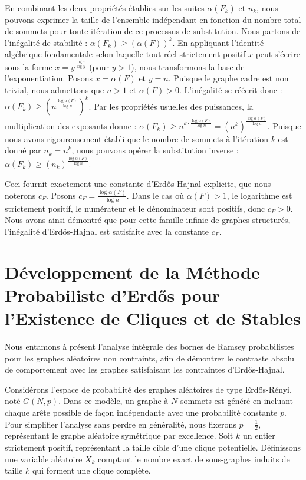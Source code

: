 \documentclass[11pt, a4paper]{article}
\begin{document}
En combinant les deux propriétés établies sur les suites $\alpha(F_k)$ et $n_k$, nous pouvons exprimer la taille de l'ensemble indépendant en fonction du nombre total de sommets pour toute itération de ce processus de substitution.
Nous partons de l'inégalité de stabilité :
$\alpha(F_k) \ge (\alpha(F))^k$.
En appliquant l'identité algébrique fondamentale selon laquelle tout réel strictement positif $x$ peut s'écrire sous la forme $x = y^{\frac{\log x}{\log y}}$ (pour $y>1$), nous transformons la base de l'exponentiation.
Posons $x = \alpha(F)$ et $y = n$. Puisque le graphe cadre est non trivial, nous admettons que $n > 1$ et $\alpha(F) > 0$.
L'inégalité se réécrit donc :
$\alpha(F_k) \ge \left( n^{\frac{\log \alpha(F)}{\log n}} \right)^k$.
Par les propriétés usuelles des puissances, la multiplication des exposants donne :
$\alpha(F_k) \ge n^{k \cdot \frac{\log \alpha(F)}{\log n}} = (n^k)^{\frac{\log \alpha(F)}{\log n}}$.
Puisque nous avons rigoureusement établi que le nombre de sommets à l'itération $k$ est donné par $n_k = n^k$, nous pouvons opérer la substitution inverse :
$\alpha(F_k) \ge (n_k)^{\frac{\log \alpha(F)}{\log n}}$.

Ceci fournit exactement une constante d'Erdős-Hajnal explicite, que nous noterons $c_F$.
Posons $c_F = \frac{\log \alpha(F)}{\log n}$.
Dans le cas où $\alpha(F) > 1$, le logarithme est strictement positif, le numérateur et le dénominateur sont positifs, donc $c_F > 0$.
Nous avons ainsi démontré que pour cette famille infinie de graphes structurés, l'inégalité d'Erdős-Hajnal est satisfaite avec la constante $c_F$.

\newpage
\section{Développement de la Méthode Probabiliste d'Erdős pour l'Existence de Cliques et de Stables}

Nous entamons à présent l'analyse intégrale des bornes de Ramsey probabilistes pour les graphes aléatoires non contraints, afin de démontrer le contraste absolu de comportement avec les graphes satisfaisant les contraintes d'Erdős-Hajnal.

Considérons l'espace de probabilité des graphes aléatoires de type Erdős-Rényi, noté $G(N, p)$.
Dans ce modèle, un graphe à $N$ sommets est généré en incluant chaque arête possible de façon indépendante avec une probabilité constante $p$.
Pour simplifier l'analyse sans perdre en généralité, nous fixerons $p = \frac{1}{2}$, représentant le graphe aléatoire symétrique par excellence.
Soit $k$ un entier strictement positif, représentant la taille cible d'une clique potentielle.
Définissons une variable aléatoire $X_k$ comptant le nombre exact de sous-graphes induits de taille $k$ qui forment une clique complète.
\end{document}
